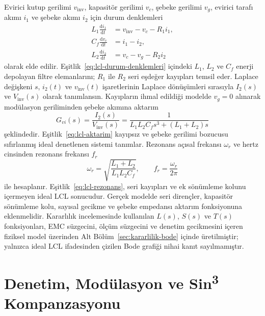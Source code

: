 Evirici kutup gerilimi $v_{\mathrm{inv}}$, kapasitör gerilimi $v_c$, şebeke gerilimi $v_g$, evirici tarafı akımı $i_1$ ve şebeke akımı $i_2$ için durum denklemleri
\begin{equation}
  \begin{aligned}
    L_1\frac{\mathrm{d}i_1}{\mathrm{d}t} &= v_{\mathrm{inv}}-v_c-R_1i_1, \\
    C_f\frac{\mathrm{d}v_c}{\mathrm{d}t} &= i_1-i_2, \\
    L_2\frac{\mathrm{d}i_2}{\mathrm{d}t} &= v_c-v_g-R_2i_2
  \end{aligned}
  \label{eq:lcl-durum-denklemleri}
\end{equation}
olarak elde edilir. Eşitlik~\eqref{eq:lcl-durum-denklemleri} içindeki $L_1$, $L_2$ ve $C_f$ enerji depolayan filtre elemanlarını; $R_1$ ile $R_2$ seri eşdeğer kayıpları temsil eder. Laplace değişkeni $s$, $i_2(t)$ ve $v_{\mathrm{inv}}(t)$ işaretlerinin Laplace dönüşümleri sırasıyla $I_2(s)$ ve $V_{\mathrm{inv}}(s)$ olarak tanımlansın. Kayıpların ihmal edildiği modelde $v_g=0$ alınarak modülasyon geriliminden şebeke akımına aktarım
\begin{equation}
  G_{vi}(s)=\frac{I_2(s)}{V_{\mathrm{inv}}(s)}
  =\frac{1}{L_1L_2C_fs^3+(L_1+L_2)s}
  \label{eq:lcl-aktarim}
\end{equation}
şeklindedir. Eşitlik~\eqref{eq:lcl-aktarim} kayıpsız ve şebeke gerilimi bozucusu sıfırlanmış ideal denetlenen sistemi tanımlar. Rezonans açısal frekansı $\omega_r$ ve hertz cinsinden rezonans frekansı $f_r$
\begin{equation}
  \omega_r=\sqrt{\frac{L_1+L_2}{L_1L_2C_f}},
  \qquad f_r=\frac{\omega_r}{2\pi}
  \label{eq:lcl-rezonans}
\end{equation}
ile hesaplanır. Eşitlik~\eqref{eq:lcl-rezonans}, seri kayıpları ve ek sönümleme kolunu içermeyen ideal LCL sonucudur. Gerçek modelde seri dirençler, kapasitör sönümleme kolu, sayısal gecikme ve şebeke empedansı aktarım fonksiyonuna eklenmelidir. Kararlılık incelemesinde kullanılan $L(s)$, $S(s)$ ve $T(s)$ fonksiyonları, EMC süzgecini, ölçüm süzgecini ve denetim gecikmesini içeren fiziksel model üzerinden Alt Bölüm~\ref{sec:kararlilik-bode} içinde üretilmiştir; yalnızca ideal LCL ifadesinden çizilen Bode grafiği nihai kanıt sayılmamıştır.

\section{Denetim, Modülasyon ve Sin\texorpdfstring{\textsuperscript{3}}{3} Kompanzasyonu}


